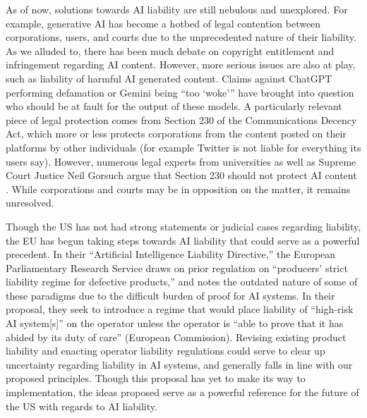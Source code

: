 \documentclass[10pt]{article}
\begin{document}
    As of now, solutions towards AI liability are still nebulous and unexplored. For example, generative AI has become a hotbed of legal contention between corporations, users, and courts due to the unprecedented nature of their liability. As we alluded to, there has been much debate on copyright entitlement and infringement regarding AI content. However, more serious issues are also at play, such as liability of harmful AI generated content. Claims against ChatGPT performing defamation or Gemini being “too ‘woke’” have brought into question who should be at fault for the output of these models. A particularly relevant piece of legal protection comes from Section 230 of the Communications Decency Act, which more or less protects corporations from the content posted on their platforms by other individuals (for example Twitter is not liable for everything its users say). However, numerous legal experts from universities as well as Supreme Court Justice Neil Gorsuch argue that Section 230 should not protect AI content \cite{mims2024ai}. While corporations and courts may be in opposition on the matter, it remains unresolved.

    Though the US has not had strong statements or judicial cases regarding liability, the EU has begun taking steps towards AI liability that could serve as a powerful precedent. In their “Artificial Intelligence Liability Directive,” the European Parliamentary Research Service draws on prior regulation on “producers’ strict liability regime for defective products,” and notes the outdated nature of some of these paradigms due to the difficult burden of proof for AI systems. In their proposal, they seek to introduce a regime that would place liability of “high-risk AI system[s]” on the operator unless the operator is “able to prove that it has abided by its duty of care” (European Commission). Revising existing product liability and enacting operator liability regulations could serve to clear up uncertainty regarding liability in AI systems, and generally falls in line with our proposed principles. Though this proposal has yet to make its way to implementation, the ideas proposed serve as a powerful reference for the future of the US with regards to AI liability.
\end{document}
